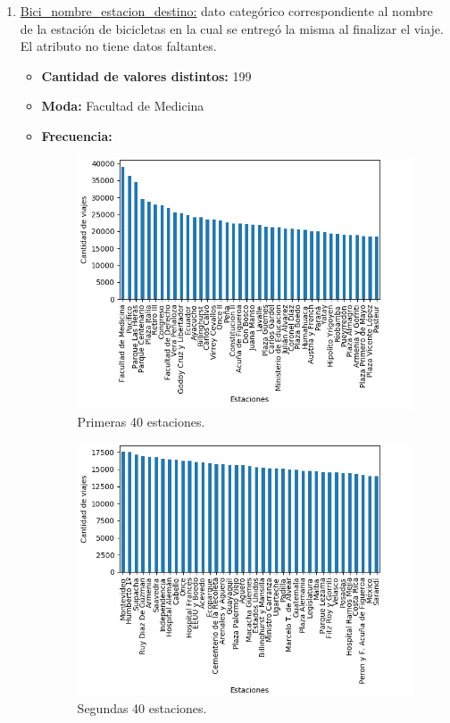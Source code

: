 \begin{enumerate}
\begin{itemize}
        \end{itemize}    
    \item \underline{Bici_nombre_estacion_destino:} dato categórico correspondiente al nombre de la estación de bicicletas en la cual se entregó la misma al finalizar el viaje. El atributo no tiene datos faltantes.
        \begin{itemize}
            \item \textbf{Cantidad de valores distintos:} 199
            \item \textbf{Moda:} Facultad de Medicina 
            \item \textbf{Frecuencia:}
 \begin{figure}[H]
    \centering
    \includegraphics[scale=0.8]{imagenes/nombreDestinoEst1.png}
    \caption{Primeras 40 estaciones.}
 \label{fig: cluster}
\end{figure}

\begin{figure}[H]
    \centering
    \includegraphics[scale=0.8]{imagenes/nombreDestinoEst2.png}
    \caption{Segundas 40 estaciones.}
 \label{fig: cluster}
\end{figure}


\end{itemize}
\end{enumerate}
